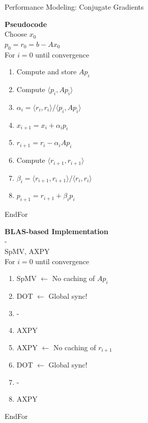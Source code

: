 \begin{frame}[fragile]{Performance Modeling: Conjugate Gradients}

 \begin{block}{}
  
   \begin{minipage}{0.45\textwidth}
      {\large \textbf{Pseudocode}} \\
      
      Choose $x_0$ \\
      $p_0 = r_0 = b - Ax_0$ \\
      For $i=0$ until convergence
     \begin{enumerate}
      \item Compute and store $Ap_i$
      \item Compute $\langle p_i, Ap_i \rangle$
      \item $\alpha_i = \langle r_i, r_i \rangle / \langle p_i, Ap_i \rangle$
      \item $x_{i+1} = x_{i} + \alpha_i p_i$          
      \item $r_{i+1} = r_i - \alpha_i Ap_i$       
      \item Compute $\langle r_{i+1}, r_{i+1} \rangle$
      \item $\beta_i = \langle r_{i+1}, r_{i+1} \rangle / \langle r_i, r_i \rangle$
      \item $p_{i+1} = r_{i+1} + \beta_i p_i$
     \end{enumerate}
     EndFor
   \end{minipage}
   \begin{minipage}{0.48\textwidth}
      {\large \textbf{BLAS-based Implementation}} \\
      
            - \\
      SpMV, AXPY \\
      For $i=0$ until convergence
     \begin{enumerate}
      \item SpMV {\color{blue} $\leftarrow$ No caching of $Ap_i$}
      \item DOT {\color{red} $\leftarrow$ Global sync!}
      \item -
      \item AXPY         
      \item AXPY  {\color{blue} $\leftarrow$ No caching of $r_{i+1}$}
      \item DOT {\color{red} $\leftarrow$ Global sync!}
      \item -
      \item AXPY
     \end{enumerate}
     EndFor
   \end{minipage}
   
   \end{block}
   
\end{frame}

